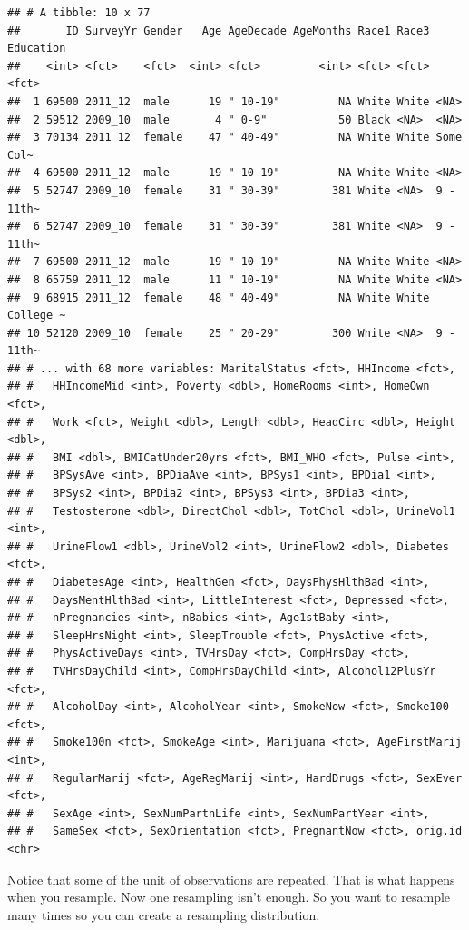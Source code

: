 \documentclass[]{book}
\begin{document}
\begin{verbatim}
## # A tibble: 10 x 77
##       ID SurveyYr Gender   Age AgeDecade AgeMonths Race1 Race3 Education
##    <int> <fct>    <fct>  <int> <fct>         <int> <fct> <fct> <fct>    
##  1 69500 2011_12  male      19 " 10-19"         NA White White <NA>     
##  2 59512 2009_10  male       4 " 0-9"           50 Black <NA>  <NA>     
##  3 70134 2011_12  female    47 " 40-49"         NA White White Some Col~
##  4 69500 2011_12  male      19 " 10-19"         NA White White <NA>     
##  5 52747 2009_10  female    31 " 30-39"        381 White <NA>  9 - 11th~
##  6 52747 2009_10  female    31 " 30-39"        381 White <NA>  9 - 11th~
##  7 69500 2011_12  male      19 " 10-19"         NA White White <NA>     
##  8 65759 2011_12  male      11 " 10-19"         NA White White <NA>     
##  9 68915 2011_12  female    48 " 40-49"         NA White White College ~
## 10 52120 2009_10  female    25 " 20-29"        300 White <NA>  9 - 11th~
## # ... with 68 more variables: MaritalStatus <fct>, HHIncome <fct>,
## #   HHIncomeMid <int>, Poverty <dbl>, HomeRooms <int>, HomeOwn <fct>,
## #   Work <fct>, Weight <dbl>, Length <dbl>, HeadCirc <dbl>, Height <dbl>,
## #   BMI <dbl>, BMICatUnder20yrs <fct>, BMI_WHO <fct>, Pulse <int>,
## #   BPSysAve <int>, BPDiaAve <int>, BPSys1 <int>, BPDia1 <int>,
## #   BPSys2 <int>, BPDia2 <int>, BPSys3 <int>, BPDia3 <int>,
## #   Testosterone <dbl>, DirectChol <dbl>, TotChol <dbl>, UrineVol1 <int>,
## #   UrineFlow1 <dbl>, UrineVol2 <int>, UrineFlow2 <dbl>, Diabetes <fct>,
## #   DiabetesAge <int>, HealthGen <fct>, DaysPhysHlthBad <int>,
## #   DaysMentHlthBad <int>, LittleInterest <fct>, Depressed <fct>,
## #   nPregnancies <int>, nBabies <int>, Age1stBaby <int>,
## #   SleepHrsNight <int>, SleepTrouble <fct>, PhysActive <fct>,
## #   PhysActiveDays <int>, TVHrsDay <fct>, CompHrsDay <fct>,
## #   TVHrsDayChild <int>, CompHrsDayChild <int>, Alcohol12PlusYr <fct>,
## #   AlcoholDay <int>, AlcoholYear <int>, SmokeNow <fct>, Smoke100 <fct>,
## #   Smoke100n <fct>, SmokeAge <int>, Marijuana <fct>, AgeFirstMarij <int>,
## #   RegularMarij <fct>, AgeRegMarij <int>, HardDrugs <fct>, SexEver <fct>,
## #   SexAge <int>, SexNumPartnLife <int>, SexNumPartYear <int>,
## #   SameSex <fct>, SexOrientation <fct>, PregnantNow <fct>, orig.id <chr>
\end{verbatim}



Notice that some of the unit of observations are repeated. That is what happens when you resample. Now one resampling isn't enough. So you want to resample many times so you can create a resampling distribution.
\end{document}

